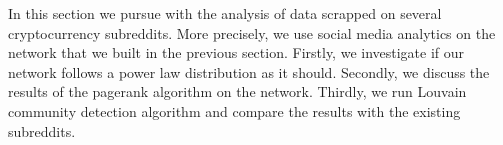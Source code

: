 In this section we pursue with the analysis of data scrapped on several cryptocurrency subreddits. More precisely, we use social media analytics on the network that we built in the previous section. Firstly, we investigate if our network follows a power law distribution as it should. Secondly, we discuss the results of the pagerank algorithm on the network. Thirdly, we run Louvain community detection algorithm and compare the results with the existing subreddits.
